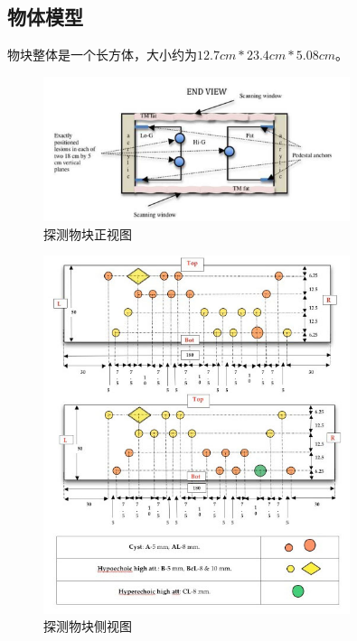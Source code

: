 \subsection{物体模型}
物块整体是一个长方体，大小约为$12.7cm*23.4cm*5.08cm$。
\begin{figure}[h!]
\center
\includegraphics[width=0.8\textwidth]{figure/object/front}
\caption{探测物块正视图}\label{fig:objfront}
\end{figure}
\begin{figure}[h!]
\center
\includegraphics[width=0.8\textwidth]{figure/object/side}
\caption{探测物块侧视图}\label{fig:objside}
\end{figure}
